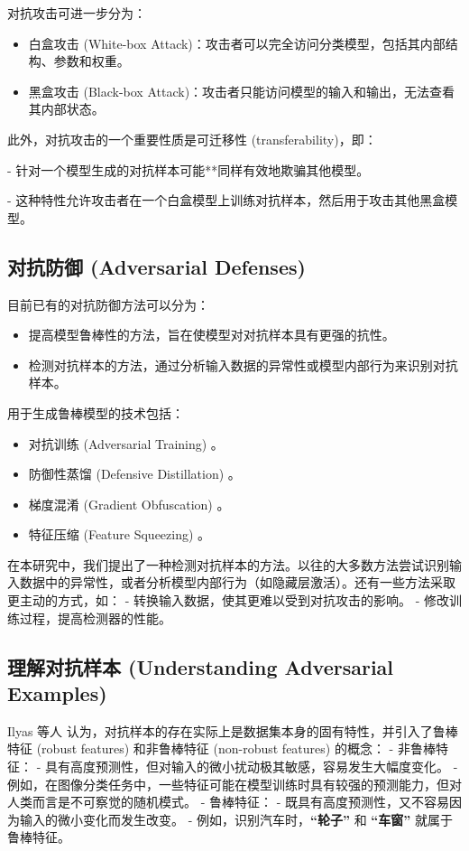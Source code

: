 \documentclass[12pt, a4paper]{ctexart} %
\begin{document}
对抗攻击可进一步分为：
\begin{itemize}
    \item 白盒攻击 (White-box Attack)：攻击者可以完全访问分类模型，包括其内部结构、参数和权重。
    \item 黑盒攻击 (Black-box Attack)：攻击者只能访问模型的输入和输出，无法查看其内部状态。
\end{itemize}

此外，对抗攻击的一个重要性质是可迁移性 (transferability)，即：

- 针对一个模型生成的对抗样本可能**同样有效地欺骗其他模型。

- 这种特性允许攻击者在一个白盒模型上训练对抗样本，然后用于攻击其他黑盒模型。

\subsection{对抗防御 (Adversarial Defenses)}

目前已有的对抗防御方法可以分为：
\begin{itemize}
    \item 提高模型鲁棒性的方法，旨在使模型对对抗样本具有更强的抗性。
    \item 检测对抗样本的方法，通过分析输入数据的异常性或模型内部行为来识别对抗样本。
\end{itemize}

用于生成鲁棒模型的技术包括：
\begin{itemize}
    \item 对抗训练 (Adversarial Training) 。
    \item 防御性蒸馏 (Defensive Distillation) 。
    \item 梯度混淆 (Gradient Obfuscation) 。
    \item 特征压缩 (Feature Squeezing) 。
\end{itemize}

在本研究中，我们提出了一种检测对抗样本的方法。以往的大多数方法尝试识别输入数据中的异常性，或者分析模型内部行为（如隐藏层激活）。还有一些方法采取更主动的方式，如：
- 转换输入数据，使其更难以受到对抗攻击的影响。
- 修改训练过程，提高检测器的性能。

\subsection{理解对抗样本 (Understanding Adversarial Examples)}

Ilyas 等人 认为，对抗样本的存在实际上是数据集本身的固有特性，并引入了鲁棒特征 (robust features) 和非鲁棒特征 (non-robust features) 的概念：
- 非鲁棒特征：
  - 具有高度预测性，但对输入的微小扰动极其敏感，容易发生大幅度变化。
  - 例如，在图像分类任务中，一些特征可能在模型训练时具有较强的预测能力，但对人类而言是不可察觉的随机模式。
- 鲁棒特征：
  - 既具有高度预测性，又不容易因为输入的微小变化而发生改变。
  - 例如，识别汽车时，\textbf{“轮子”} 和 \textbf{“车窗”} 就属于鲁棒特征。
\end{document}
